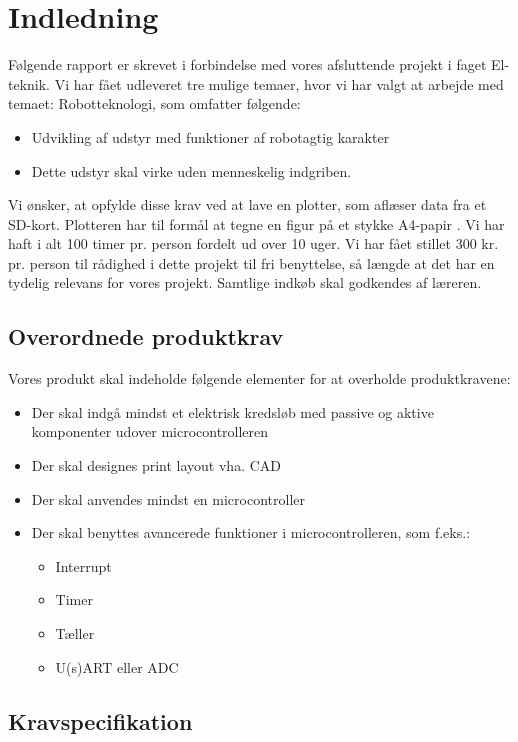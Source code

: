 \chapter{Indledning}


Følgende rapport er skrevet i forbindelse med vores afsluttende projekt i faget El-teknik.
Vi har fået udleveret tre mulige temaer, hvor vi har valgt at arbejde med temaet: Robotteknologi,
som omfatter følgende:
\begin{itemize}
\item Udvikling af udstyr med funktioner af robotagtig karakter
\item Dette udstyr skal virke uden menneskelig indgriben.
\end{itemize}


Vi ønsker, at opfylde disse krav ved at lave en plotter, som aflæser data fra et SD-kort.
Plotteren har til formål at tegne en figur på et stykke A4-papir .
Vi har haft i alt 100 timer pr. person fordelt ud over 10 uger. Vi har fået stillet 300 kr. pr. person til rådighed
i dette projekt til fri benyttelse, så længde at det har en tydelig relevans for vores projekt. Samtlige
indkøb skal godkendes af læreren.

\section{Overordnede produktkrav}
Vores produkt skal indeholde følgende elementer for at overholde produktkravene:
\begin{itemize}
\item Der skal indgå mindst et elektrisk kredsløb med passive og aktive komponenter udover microcontrolleren
\item Der skal designes print layout vha. CAD
\item Der skal anvendes mindst en microcontroller
\item Der skal benyttes avancerede funktioner i microcontrolleren, som f.eks.:
\begin{itemize}
\item Interrupt
\item Timer
\item Tæller
\item U(s)ART eller ADC
\end{itemize}
\end{itemize}

\section{Kravspecifikation}

